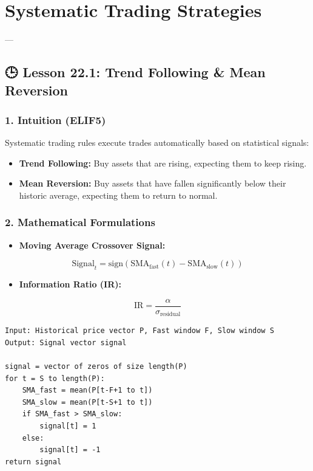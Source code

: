 \documentclass[11pt,oneside]{book}
\begin{document}
\newpage

\chapter{Systematic Trading Strategies}

---

\section{🕒 Lesson 22.1: Trend Following \& Mean Reversion}

\subsection{1. Intuition (ELIF5)}
Systematic trading rules execute trades automatically based on statistical signals:
\begin{itemize}
  \item \textbf{Trend Following:} Buy assets that are rising, expecting them to keep rising.
  \item \textbf{Mean Reversion:} Buy assets that have fallen significantly below their historic average, expecting them to return to normal.
\end{itemize}

\subsection{2. Mathematical Formulations}
\begin{itemize}
  \item \textbf{Moving Average Crossover Signal:}
\end{itemize}
  $$\text{Signal}_t = \text{sign}(\text{SMA}_{\text{fast}}(t) - \text{SMA}_{\text{slow}}(t))$$
\begin{itemize}
  \item \textbf{Information Ratio (IR):}
\end{itemize}
  $$\text{IR} = \frac{\alpha}{\sigma_{\text{residual}}}$$

\begin{tcolorbox}[colback=white,colframe=black,boxrule=0.6pt,arc=0mm,title=SMA Crossover Strategy]
\begin{verbatim}
Input: Historical price vector P, Fast window F, Slow window S
Output: Signal vector signal

signal = vector of zeros of size length(P)
for t = S to length(P):
    SMA_fast = mean(P[t-F+1 to t])
    SMA_slow = mean(P[t-S+1 to t])
    if SMA_fast > SMA_slow:
        signal[t] = 1
    else:
        signal[t] = -1
return signal
\end{verbatim}
\end{tcolorbox}
\end{document}
